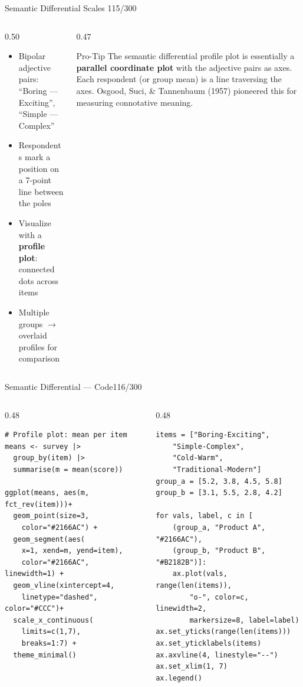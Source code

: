 \documentclass[10pt]{beamer}
\newcommand{\smark}[1]{\hfill{\scriptsize\color{codegray}#1}}
\begin{document}
\begin{frame}{Semantic Differential Scales}
\smark{115/300}
\begin{columns}[T]
\begin{column}{0.50\textwidth}
\begin{itemize}
    \item Bipolar adjective pairs: ``Boring --- Exciting'', ``Simple --- Complex''
    \item Respondents mark a position on a 7-point line between the poles
    \item Visualize with a \textbf{profile plot}: connected dots across items
    \item Multiple groups $\to$ overlaid profiles for comparison
\end{itemize}
\end{column}
\begin{column}{0.47\textwidth}
\begin{alertblock}{Pro-Tip}
    \scriptsize The semantic differential profile plot is essentially a \textbf{parallel coordinate plot} with the adjective pairs as axes. Each respondent (or group mean) is a line traversing the axes. Osgood, Suci, \& Tannenbaum (1957) pioneered this for measuring connotative meaning.
\end{alertblock}
\end{column}
\end{columns}
\end{frame}

\begin{frame}[fragile]{Semantic Differential --- Code}\smark{116/300}
\begin{columns}[T]
\begin{column}{0.48\textwidth}
\begin{lstlisting}[style=Rstyle]
# Profile plot: mean per item
means <- survey |>
  group_by(item) |>
  summarise(m = mean(score))

ggplot(means, aes(m, fct_rev(item)))+
  geom_point(size=3,
    color="#2166AC") +
  geom_segment(aes(
    x=1, xend=m, yend=item),
    color="#2166AC", linewidth=1) +
  geom_vline(xintercept=4,
    linetype="dashed", color="#CCC")+
  scale_x_continuous(
    limits=c(1,7),
    breaks=1:7) +
  theme_minimal()
\end{lstlisting}
\end{column}
\begin{column}{0.48\textwidth}
\begin{lstlisting}[style=Pystyle]
items = ["Boring-Exciting",
    "Simple-Complex",
    "Cold-Warm",
    "Traditional-Modern"]
group_a = [5.2, 3.8, 4.5, 5.8]
group_b = [3.1, 5.5, 2.8, 4.2]

for vals, label, c in [
    (group_a, "Product A", "#2166AC"),
    (group_b, "Product B", "#B2182B")]:
    ax.plot(vals, range(len(items)),
        "o-", color=c, linewidth=2,
        markersize=8, label=label)
ax.set_yticks(range(len(items)))
ax.set_yticklabels(items)
ax.axvline(4, linestyle="--")
ax.set_xlim(1, 7)
ax.legend()
\end{lstlisting}
\end{column}
\end{columns}
\end{frame}
\end{document}
